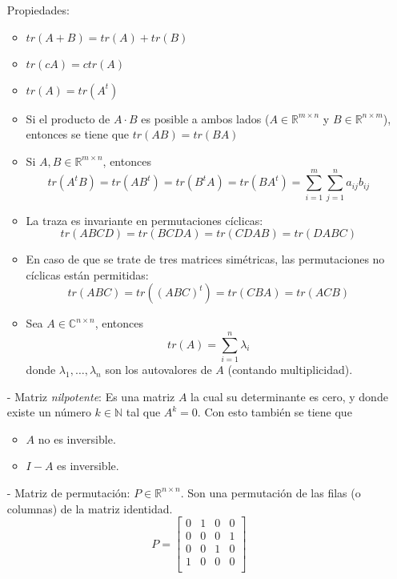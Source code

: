 \begin{itemize}
    Propiedades:
    \begin{itemize}
        \item $tr(A + B) = tr(A) + tr(B)$
        \item $tr(cA) = ctr(A)$
        \item $tr(A) = tr(A^t)$
        \item Si el producto de $A \cdot B$ es posible a ambos lados ($A \in \mathbb{R}^{m \times n}$ y $B \in \mathbb{R}^{n \times m}$), entonces se tiene que $tr(AB) = tr(BA)$
        \item Si $A,B \in \mathbb{R}^{m \times n}$, entonces
        \[tr(A^t B) = tr(AB^t) = tr(B^t A) = tr(BA^t) = \sum_{i=1}^{m}\sum_{j=1}^{n} a_{ij}b_{ij}\]
        \item La traza es invariante en permutaciones cíclicas:
        \[tr(ABCD) = tr(BCDA) = tr(CDAB) = tr(DABC)\]
        \item En caso de que se trate de tres matrices simétricas, las permutaciones no cíclicas están permitidas: 
        \[tr(ABC) = tr({(ABC)}^{t}) = tr(CBA) = tr(ACB)\]
        \item Sea $A \in \mathbb{C}^{n \times n}$, entonces 
        \[tr(A) = \sum_{i=1}^{n}\lambda_i\]
        donde $\lambda_1,\ldots,\lambda_n$ son los autovalores de $A$ (contando multiplicidad).
    \end{itemize}
    
    \item[-] Matriz \emph{nilpotente}: Es una matriz $A$ la cual su determinante es cero, y donde existe un número $k\in \mathbb{N}$ tal que $A^{k} = 0$. Con esto también se tiene que 
    \begin{itemize}
        \item $A$ no es inversible.
        \item $I - A$ es inversible.
    \end{itemize}
    \item[-] Matriz de permutación: $P \in \mathbb{R}^{n \times n}$. Son una permutación de las filas (o columnas) de la matriz identidad.
    \[
    P = 
    \begin{bmatrix}
    0 & 1 & 0 & 0 \\
    0 & 0 & 0 & 1 \\
    0 & 0 & 1 & 0 \\
    1 & 0 & 0 & 0 \\
    \end{bmatrix}
    \]
    

\end{itemize}
